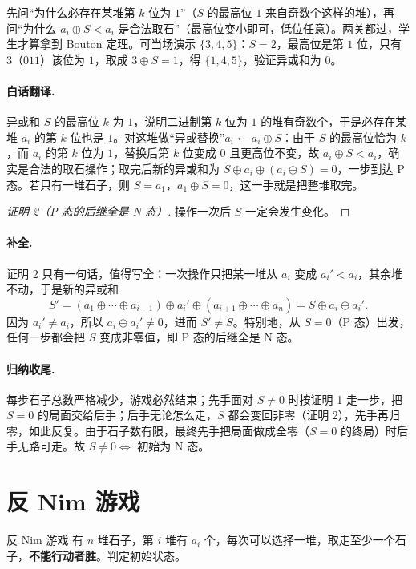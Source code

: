 \begin{teach}[证明中的两个关卡]
先问“为什么必存在某堆第 $k$ 位为 $1$”（$S$ 的最高位 $1$ 来自奇数个这样的堆），再问“为什么 $a_i\oplus S<a_i$ 是合法取石”（最高位变小即可，低位任意）。两关都过，学生才算拿到 Bouton 定理。可当场演示 $\{3,4,5\}$：$S=2$，最高位是第 $1$ 位，只有 $3$（$011$）该位为 $1$，取成 $3\oplus S=1$，得 $\{1,4,5\}$，验证异或和为 $0$。
\end{teach}
\paragraph{白话翻译.} 异或和 $S$ 的最高位 $k$ 为 $1$，说明二进制第 $k$ 位为 $1$ 的堆有奇数个，于是必存在某堆 $a_i$ 的第 $k$ 位也是 $1$。对这堆做“异或替换”$a_i\leftarrow a_i\oplus S$：由于 $S$ 的最高位恰为 $k$，而 $a_i$ 的第 $k$ 位为 $1$，替换后第 $k$ 位变成 $0$ 且更高位不变，故 $a_i\oplus S<a_i$，确实是合法的取石操作；取完后新的异或和为 $S\oplus a_i\oplus(a_i\oplus S)=0$，一步到达 P 态。若只有一堆石子，则 $S=a_1$，$a_1\oplus S=0$，这一手就是把整堆取完。

\begin{proof}[证明 2（P 态的后继全是 N 态）]
操作一次后 $S$ 一定会发生变化。
\end{proof}
\paragraph{补全.} 证明 2 只有一句话，值得写全：一次操作只把某一堆从 $a_i$ 变成 $a_i'<a_i$，其余堆不动，于是新的异或和
\[
 S'=(a_1\oplus\cdots\oplus a_{i-1})\oplus a_i'\oplus(a_{i+1}\oplus\cdots\oplus a_n)=S\oplus a_i\oplus a_i'.
\]
因为 $a_i'\ne a_i$，所以 $a_i\oplus a_i'\ne0$，进而 $S'\ne S$。特别地，从 $S=0$（P 态）出发，任何一步都会把 $S$ 变成非零值，即 P 态的后继全是 N 态。

\paragraph{归纳收尾.} 每步石子总数严格减少，游戏必然结束；先手面对 $S\ne0$ 时按证明 1 走一步，把 $S=0$ 的局面交给后手；后手无论怎么走，$S$ 都会变回非零（证明 2），先手再归零，如此反复。由于石子数有限，最终先手把局面做成全零（$S=0$ 的终局）时后手无路可走。故 $S\ne0\iff$ 初始为 N 态。

\section{反 Nim 游戏}
\begin{problem}{反 Nim 游戏}
有 $n$ 堆石子，第 $i$ 堆有 $a_i$ 个，每次可以选择一堆，取走至少一个石子，\textbf{不能行动者胜}。判定初始状态。
\end{problem}

